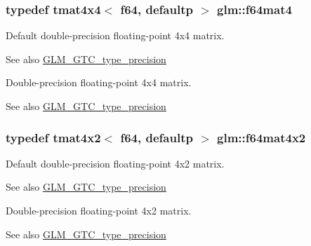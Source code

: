 \subsubsection[{f64mat4}]{\setlength{\rightskip}{0pt plus 5cm}typedef tmat4x4$<$ f64, defaultp $>$ {\bf glm\+::f64mat4}}\label{group__gtc__type__precision_ga5bfcfa195cfe908fe50ecc15abbf7979}
Default double-\/precision floating-\/point 4x4 matrix. \begin{DoxySeeAlso}{See also}
\hyperlink{group__gtc__type__precision}{G\+L\+M\+\_\+\+G\+T\+C\+\_\+type\+\_\+precision}
\end{DoxySeeAlso}
Double-\/precision floating-\/point 4x4 matrix. \begin{DoxySeeAlso}{See also}
\hyperlink{group__gtc__type__precision}{G\+L\+M\+\_\+\+G\+T\+C\+\_\+type\+\_\+precision} 
\end{DoxySeeAlso}
\hypertarget{group__gtc__type__precision_ga13dbaf75e4f1b18c35d2837067a14ce9}{}
\subsubsection[{f64mat4x2}]{\setlength{\rightskip}{0pt plus 5cm}typedef tmat4x2$<$ f64, defaultp $>$ {\bf glm\+::f64mat4x2}}\label{group__gtc__type__precision_ga13dbaf75e4f1b18c35d2837067a14ce9}
Default double-\/precision floating-\/point 4x2 matrix. \begin{DoxySeeAlso}{See also}
\hyperlink{group__gtc__type__precision}{G\+L\+M\+\_\+\+G\+T\+C\+\_\+type\+\_\+precision}
\end{DoxySeeAlso}
Double-\/precision floating-\/point 4x2 matrix. \begin{DoxySeeAlso}{See also}
\hyperlink{group__gtc__type__precision}{G\+L\+M\+\_\+\+G\+T\+C\+\_\+type\+\_\+precision} 
\end{DoxySeeAlso}
\hypertarget{group__gtc__type__precision_gab10a195a85f65da47bf70438f57a8a3c}{}
